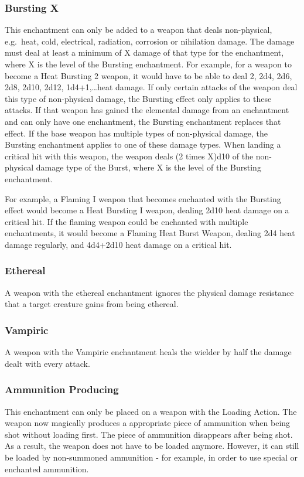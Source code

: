 \subsubsection{Bursting X}\label{enchantment:Bursting}
This enchantment can only be added to a weapon that deals non-physical, e.g.\ heat, cold, electrical, radiation, corrosion or nihilation damage.
The damage must deal at least a minimum of X damage of that type for the enchantment, where X is the level of the Bursting enchantment.
For example, for a weapon to become a Heat Bursting 2 weapon, it would have to be able to deal 2, 2d4, 2d6, 2d8, 2d10, 2d12, 1d4+1,\ldots heat damage.
If only certain attacks of the weapon deal this type of non-physical damage, the Bursting effect only applies to these attacks.
If that weapon has gained the elemental damage from an enchantment and can only have one enchantment, the Bursting enchantment replaces that effect.
If the base weapon has multiple types of non-physical damage, the Bursting enchantment applies to one of these damage types.
When landing a critical hit with this weapon, the weapon deals (2 times X)d10 of the non-physical damage type of the Burst, where X is the level of the Bursting enchantment.

For example, a Flaming I weapon that becomes enchanted with the Bursting effect would become a Heat Bursting I weapon, dealing 2d10 heat damage on a critical hit.
If the flaming weapon could be enchanted with multiple enchantments, it would become a Flaming Heat Burst Weapon, dealing 2d4 heat damage regularly, and 4d4+2d10 heat damage on a critical hit.

\subsubsection{Ethereal}\label{enchantment:Etheral}
A weapon with the ethereal enchantment ignores the physical damage resistance that a target creature gains from being ethereal.

\subsubsection{Vampiric}\label{enchantment:Vampiric}
A weapon with the Vampiric enchantment heals the wielder by half the damage dealt with every attack.

\subsubsection{Ammunition Producing}\label{enchantment:AmmuProducing}
This enchantment can only be placed on a weapon with the Loading Action.
The weapon now magically produces a appropriate piece of ammunition when being shot without loading first.
The piece of ammunition disappears after being shot.
As a result, the weapon does not have to be loaded anymore.
However, it can still be loaded by non-summoned ammunition - for example, in order to use special or enchanted ammunition.

